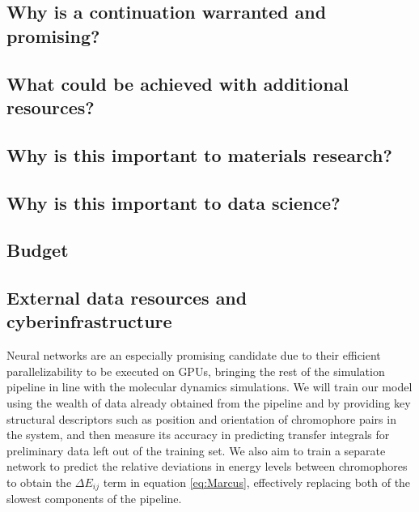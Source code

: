 \documentclass[12pt]{article}
\begin{document}
\subsection{Why is a continuation warranted and promising?}


\subsection{What could be achieved with additional resources?}


\subsection{Why is this important to materials research?}

\subsection{Why is this important to data science?}

\subsection{Budget}

\subsection{External data resources and cyberinfrastructure}


Neural networks are an especially promising candidate due to their efficient parallelizability to be executed on GPUs, bringing the rest of the simulation pipeline in line with the molecular dynamics simulations\cite{Oh2004}.
We will train our model using the wealth of data already obtained from the pipeline and by providing key structural descriptors such as position and orientation of chromophore pairs in the system, and then measure its accuracy in predicting transfer integrals for preliminary data left out of the training set.
We also aim to train a separate network to predict the relative deviations in energy levels between chromophores to obtain the $\Delta E_{ij}$ term in equation \ref{eq:Marcus}, effectively replacing both of the slowest components of the pipeline.
\end{document}
